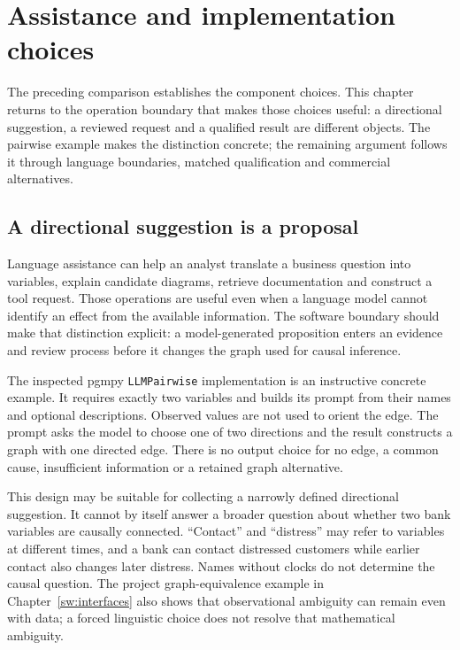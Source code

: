 \chapter{Assistance and implementation choices}
\label{sw:agents}

The preceding comparison establishes the component choices. This chapter
returns to the operation boundary that makes those choices useful: a
directional suggestion, a reviewed request and a qualified result are
different objects. The pairwise example makes the distinction concrete;
the remaining argument follows it through language boundaries, matched
qualification and commercial alternatives.


\section{A directional suggestion is a proposal}

Language assistance can help an analyst translate a business question into
variables, explain candidate diagrams, retrieve documentation and construct a
tool request. Those operations are useful even when a language model cannot
identify an effect from the available information. The software boundary should
make that distinction explicit: a model-generated proposition enters an evidence
and review process before it changes the graph used for causal inference.

The inspected pgmpy \texttt{LLMPairwise} implementation is an instructive
concrete example. It requires exactly two variables and builds its prompt from
their names and optional descriptions. Observed values are not used to orient
the edge. The prompt asks the model to choose one of two directions and the
result constructs a graph with one directed edge. There is no output choice
for no edge, a common cause, insufficient information or a retained graph
alternative. \citep{v12_sw_pgmpy}

This design may be suitable for collecting a narrowly defined directional
suggestion. It cannot by itself answer a broader question about whether two
bank variables are causally connected. ``Contact'' and ``distress'' may refer
to variables at different times, and a bank can contact distressed customers
while earlier contact also changes later distress. Names without clocks do
not determine the causal question. The project graph-equivalence example in
Chapter~\ref{sw:interfaces} also shows that observational ambiguity can remain
even with data; a forced linguistic choice does not resolve that mathematical
ambiguity.

